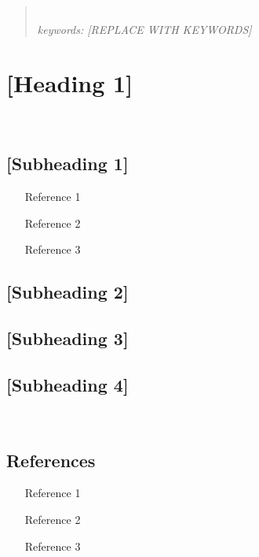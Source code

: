 \documentclass[11pt]{article} %
\begin{document}

	
	\begin{abstract}
		\lipsum[1-1]  \\ %
		 

		{{\it keywords:  [REPLACE WITH KEYWORDS]}}
	\end{abstract}

	\pagebreak
	
	
	\tableofcontents
	\pagebreak
	
	\section{[Heading 1]}    	 		%
	\lipsum[1-1]\\
	
	\subsection{[Subheading 1]}
	
	\lipsum[2-4] %
	\begin{itemize}
		\item [Reference 1]
		\item [Reference 2]
		\item [Reference 3]
	\end{itemize}
	
	\subsection{[Subheading 2]}
	\lipsum[2-4] %
	
	\subsection{[Subheading 3]}
	\lipsum[2-4] %
	
	\subsection{[Subheading 4]}
	\lipsum[1-1] \\
	
	\subsection{References}
	\begin{itemize}
		\item [Reference 1]
		\item [Reference 2]
		\item [Reference 3]
	\end{itemize}
	
\end{document}
